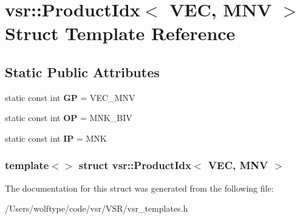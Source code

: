 \hypertarget{structvsr_1_1_product_idx_3_01_v_e_c_00_01_m_n_v_01_4}{\section{vsr\-:\-:Product\-Idx$<$ V\-E\-C, M\-N\-V $>$ Struct Template Reference}
\label{structvsr_1_1_product_idx_3_01_v_e_c_00_01_m_n_v_01_4}
}
\subsection*{Static Public Attributes}
\begin{DoxyCompactItemize}
\item 
\hypertarget{structvsr_1_1_product_idx_3_01_v_e_c_00_01_m_n_v_01_4_ac521ecc89790b5d74899767b2ffe12a7}{static const int {\bfseries G\-P} = V\-E\-C\-\_\-\-M\-N\-V}\label{structvsr_1_1_product_idx_3_01_v_e_c_00_01_m_n_v_01_4_ac521ecc89790b5d74899767b2ffe12a7}

\item 
\hypertarget{structvsr_1_1_product_idx_3_01_v_e_c_00_01_m_n_v_01_4_aa6f64744b9c3e913cdaead7805845d20}{static const int {\bfseries O\-P} = M\-N\-K\-\_\-\-B\-I\-V}\label{structvsr_1_1_product_idx_3_01_v_e_c_00_01_m_n_v_01_4_aa6f64744b9c3e913cdaead7805845d20}

\item 
\hypertarget{structvsr_1_1_product_idx_3_01_v_e_c_00_01_m_n_v_01_4_aaa4fae414c27d03a5028ea71009ccd9a}{static const int {\bfseries I\-P} = M\-N\-K}\label{structvsr_1_1_product_idx_3_01_v_e_c_00_01_m_n_v_01_4_aaa4fae414c27d03a5028ea71009ccd9a}

\end{DoxyCompactItemize}
\subsubsection*{template$<$$>$ struct vsr\-::\-Product\-Idx$<$ V\-E\-C, M\-N\-V $>$}



The documentation for this struct was generated from the following file\-:\begin{DoxyCompactItemize}
\item 
/\-Users/wolftype/code/vsr/\-V\-S\-R/vsr\-\_\-templates.\-h\end{DoxyCompactItemize}

